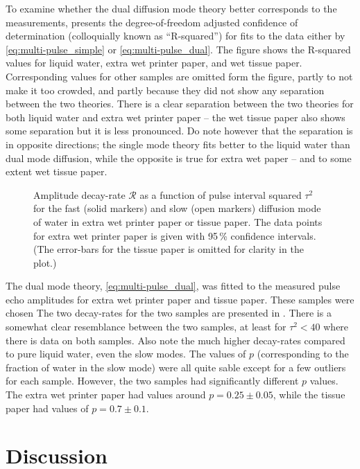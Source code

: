 \documentclass[11pt,a4paper, twocolumn,
swedish, english %
]{article}
\begin{document}
To examine whether the dual diffusion mode theory better corresponds
to the measurements,  presents the
degree-of-freedom adjusted confidence of determination (colloquially
known as ``R-squared'') for fits to the data either by
\eqref{eq:multi-pulse_simple} or \eqref{eq:multi-pulse_dual}. The
figure shows the R-squared values for liquid water, extra wet
printer paper, and wet tissue paper. Corresponding values for other
samples are omitted form the figure, partly to not make it too
crowded, and partly because they did not show any separation between
the two theories. There is a clear separation between the two theories for
both liquid water and extra wet printer paper -- the wet tissue paper
also shows some separation but it is less
pronounced. Do note however that the separation is in opposite
directions; the single mode theory fits better to the liquid water
than dual mode diffusion, while the opposite is true for extra wet
paper -- and to some extent wet tissue paper. 


\begin{figure*}
\centering

\caption{Amplitude decay-rate $\mathcal{R}$ as a function of pulse
  interval squared $\tau^2$ for the fast (solid markers) and slow
  (open markers) diffusion mode of water in extra wet printer paper or
  tissue paper. The data points for extra wet printer paper is given
  with 95\,\% confidence intervals. (The error-bars for the tissue
  paper is omitted for clarity in the plot.) } 
\label{fig:dual-diff}
\end{figure*}

The dual mode theory, \eqref{eq:multi-pulse_dual}, was fitted to the
measured pulse echo amplitudes for extra wet printer paper and tissue
paper. These samples were chosen 
The two decay-rates for the two samples are presented in
. There is a somewhat clear resemblance between
the two samples, at least for $\tau^2<40$ where there is data on both
samples. Also note the much higher decay-rates compared to pure liquid
water, even the slow modes. The values of $p$ (corresponding to the
fraction of water in the slow mode) were all quite sable except for a
few outliers for each sample. However, the two samples had
significantly different $p$ values. The extra wet printer paper had
values around $p=0.25\pm0.05$, while the tissue paper had values of 
$p=0.7\pm0.1$.


\section{Discussion}
\end{document}
